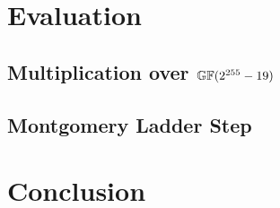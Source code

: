 \documentclass{llncs}
\begin{document}
\section{Evaluation}
\label{section:evaluation}


\subsection{Multiplication over $\mathbb{GF}(2^{255}-19)$}
\label{subection:evaluation:multiplication}


\subsection{Montgomery Ladder Step}
\label{subsection:evaluation:ladder-step}


\section{Conclusion}
\label{section:conclusion}



%


\end{document}
